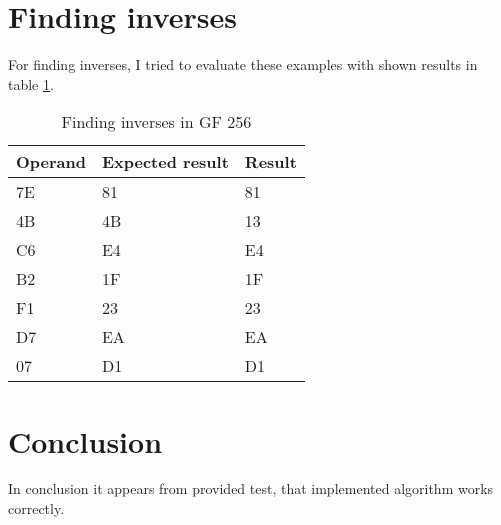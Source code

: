 \documentclass[5pt]{article}
\begin{document}
\newpage
\section{Finding inverses}
For finding inverses, I tried to evaluate these examples with shown results in
table \ref{tab:inverses}.

\begin{table}[ht]
  \centering
  \caption{Finding inverses in GF 256}
  \begin{tabular}{|l|l|l|}
  \hline
  Operand &  Expected result & Result\\
  \hline
  \hline
  
  7E & 81 & 81 \\
  \hline
4B & 4B & 13\\
\hline
C6 & E4 & E4\\
\hline
B2 & 1F & 1F \\
\hline
F1 & 23 & 23\\
\hline 	
D7 & EA & EA \\
\hline 	
07& D1 &	D1\\
\hline

  \end{tabular}
  \label{tab:inverses}
\end{table}


\section{Conclusion}
In conclusion it appears from provided test, that implemented algorithm works
correctly.
\end{document}
